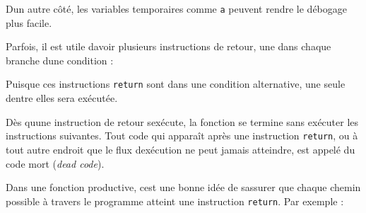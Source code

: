 \begin{Shaded}
\begin{Highlighting}[]
    \OperatorTok{*}\OperatorTok{**}
\end{Highlighting}
\end{Shaded}

D\textquotesingle un autre côté, les variables temporaires comme
\texttt{a} peuvent rendre le débogage plus facile.

Parfois, il est utile d\textquotesingle avoir plusieurs instructions de
retour, une dans chaque branche d\textquotesingle une condition :

\begin{Shaded}
\begin{Highlighting}[]
    \OperatorTok{\textless{}} \NormalTok{:}
         \OperatorTok{{-}}
    \NormalTok{:}
\end{Highlighting}
\end{Shaded}

Puisque ces instructions \texttt{return} sont dans une condition
alternative, une seule d\textquotesingle entre elles sera exécutée.

Dès qu\textquotesingle une instruction de retour
s\textquotesingle exécute, la fonction se termine sans exécuter les
instructions suivantes. Tout code qui apparaît après une instruction
\texttt{return}, ou à tout autre endroit que le flux
d\textquotesingle exécution ne peut jamais atteindre, est appelé du code
mort (\emph{dead code}).

Dans une fonction productive, c\textquotesingle est une bonne idée de
s\textquotesingle assurer que chaque chemin possible à travers le
programme atteint une instruction \texttt{return}. Par exemple :

\begin{Shaded}
\begin{Highlighting}[]
    \OperatorTok{\textless{}} \NormalTok{:}
         \OperatorTok{{-}}
    \OperatorTok{\textgreater{}} \NormalTok{:}
\end{Highlighting}
\end{Shaded}


